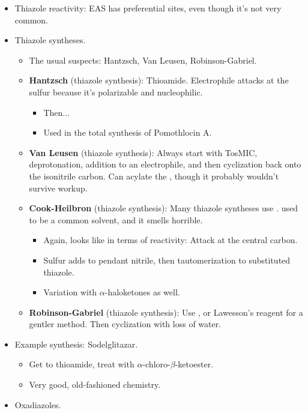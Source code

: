 \documentclass[../notes.tex]{subfiles}
\begin{document}
\begin{itemize}
    \item Thiazole reactivity: EAS has preferential sites, even though it's not very common.
    \item Thiazole syntheses.
    \begin{itemize}
        \item The usual suspects: Hantzsch, Van Leusen, Robinson-Gabriel.
        \item \textbf{Hantzsch} (thiazole synthesis): Thioamide. Electrophile attacks at the sulfur because it's polarizable and nucleophilic.
        \begin{itemize}
            \item Then...
            \item Used in the total synthesis of Pomothlocin A.
        \end{itemize}
        \item \textbf{Van Leusen} (thiazole synthesis): Always start with TosMIC, deprotonation, addition to an electrophile, and then cyclization back onto the isonitrile carbon. Can acylate the , though it probably wouldn't survive workup.
        \item \textbf{Cook-Heilbron} (thiazole synthesis): Many thiazole syntheses use .  used to be a common solvent, and it smells horrible.
        \begin{itemize}
            \item Again,  looks like  in terms of reactivity: Attack at the central carbon.
            \item Sulfur adds to pendant nitrile, then tautomerization to substituted thiazole.
            \item Variation with $\alpha$-haloketones as well.
        \end{itemize}
        \item \textbf{Robinson-Gabriel} (thiazole synthesis): Use , or Lawesson's reagent for a gentler method. Then cyclization with loss of water.
    \end{itemize}
    \item Example synthesis: Sodelglitazar.
    \begin{itemize}
        \item Get to thioamide, treat with $\alpha$-chloro-$\beta$-ketoester.
        \item Very good, old-fashioned chemistry.
    \end{itemize}
    \item Oxadiazoles.
    \begin{itemize}

\end{itemize}
\end{itemize}
\end{document}
